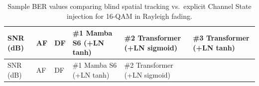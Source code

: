 \documentclass[
  english,
  12pt,
  12pt,
  a4paper,
  oneside]{report}
\begin{document}
\begin{longtable}[]{@{}
  >{\raggedright\arraybackslash}p{}
  >{\raggedright\arraybackslash}p{}
  >{\raggedright\arraybackslash}p{}
  >{\raggedright\arraybackslash}p{}
  >{\raggedright\arraybackslash}p{}
  >{\raggedright\arraybackslash}p{}@{}}
\caption{Sample BER values comparing blind spatial tracking vs.~explicit Channel State injection for 16-QAM in Rayleigh fading.}\label{tbl:table18}\tabularnewline
\toprule\noalign{}
\begin{minipage}[b]{\linewidth}\raggedright
SNR (dB)
\end{minipage} & \begin{minipage}[b]{\linewidth}\raggedright
AF
\end{minipage} & \begin{minipage}[b]{\linewidth}\raggedright
DF
\end{minipage} & \begin{minipage}[b]{\linewidth}\raggedright
\#1 Mamba S6 (+LN tanh)
\end{minipage} & \begin{minipage}[b]{\linewidth}\raggedright
\#2 Transformer (+LN sigmoid)
\end{minipage} & \begin{minipage}[b]{\linewidth}\raggedright
\#3 Transformer (+LN tanh)
\end{minipage} \\
\midrule\noalign{}
\endfirsthead
\toprule\noalign{}
\begin{minipage}[b]{\linewidth}\raggedright
SNR (dB)
\end{minipage} & \begin{minipage}[b]{\linewidth}\raggedright
AF
\end{minipage} & \begin{minipage}[b]{\linewidth}\raggedright
DF
\end{minipage} & \begin{minipage}[b]{\linewidth}\raggedright
\#1 Mamba S6 (+LN tanh)
\end{minipage} & \begin{minipage}[b]{\linewidth}\raggedright
\#2 Transformer (+LN sigmoid)
\end{minipage} & \begin{minipage}[b]{\linewidth}\raggedright

\end{minipage}
\end{longtable}
\end{document}
